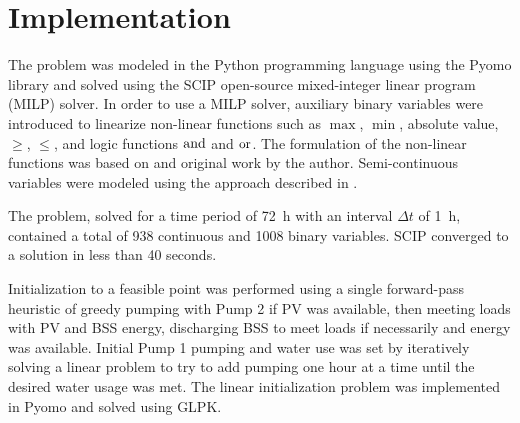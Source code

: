 \section{Implementation}
\label{sec:implementation}

The problem was modeled in the Python programming language using the Pyomo library\cite{hart2011pyomo,bynum2021pyomo} and solved using
the SCIP\cite{Scip80}
open-source mixed-integer linear program (MILP) solver. In order to use a MILP solver, auxiliary binary variables were introduced to linearize non-linear functions such as $\max$, $\min$, absolute value, $\ge$, $\le$, and logic functions $\operatorname{and}$ and $\operatorname{or}$. The formulation of the non-linear functions was based on \cite{YALPMIP_logic} and original work by the author.
Semi-continuous variables were modeled using the approach described in \cite{MILP_handout}.

The problem, solved for a time period of \SI{72}{h} with an interval $\Delta t$ of \SI{1}{h}, contained a total of 938 continuous and 1008 binary variables.
SCIP converged to a solution in less than 40 seconds.

Initialization to a feasible point was performed using a single forward-pass heuristic of greedy pumping with Pump 2 if PV was available, then meeting loads with PV and BSS energy, discharging BSS to meet loads if necessarily and energy was available. Initial Pump 1 pumping and water use was set by iteratively solving a linear problem to try to add pumping one hour at a time until the desired water usage was met. The linear initialization problem was implemented in Pyomo and solved using GLPK\cite{GLPK}.
